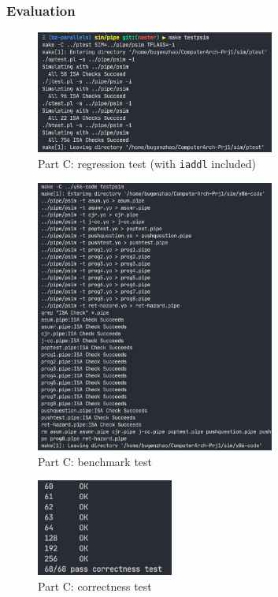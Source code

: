 \documentclass[12pt,a4paper]{article}
\begin{document}
\subsubsection{Evaluation}
\begin{figure}[H] %
        \centering %
        \includegraphics[width=0.7\textwidth]{partC-regression-test.png} %
        \caption{Part C: regression test (with \texttt{iaddl} included)} %
        \label{Fig.partC-regression} %
\end{figure}
\begin{figure}[H] %
        \centering %
        \includegraphics[width=0.7\textwidth]{partC-test2.png} %
        \caption{Part C: benchmark test} %
        \label{Fig.partC-benchmark} %
\end{figure}
\begin{figure}[H] %
        \centering %
        \includegraphics[width=0.4\textwidth]{partC-correctness-test.png} %
        \caption{Part C: correctness test} %
        \label{Fig.partC-correctness} %
\end{figure}
\end{document}
